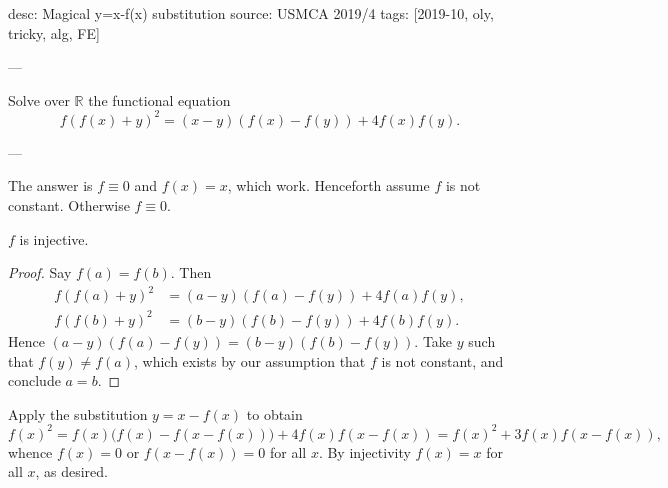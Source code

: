 desc: Magical y=x-f(x) substitution
source: USMCA 2019/4
tags: [2019-10, oly, tricky, alg, FE]

---

Solve over $\mathbb R$ the functional equation \[f(f(x)+y)^2=(x-y)(f(x)-f(y))+4f(x)f(y).\]

---

The answer is $f\equiv0$ and $f(x)=x$, which work. Henceforth assume $f$ is not constant. Otherwise $f\equiv0$.
\begin{iclaim*}
    $f$ is injective.
\end{iclaim*}
\begin{proof}
    Say $f(a)=f(b)$. Then 
    \begin{align*}
        f(f(a)+y)^2&=(a-y)(f(a)-f(y))+4f(a)f(y),\\
        f(f(b)+y)^2&=(b-y)(f(b)-f(y))+4f(b)f(y).
    \end{align*}
    Hence $(a-y)(f(a)-f(y))=(b-y)(f(b)-f(y))$. Take $y$ such that $f(y)\ne f(a)$, which exists by our assumption that $f$ is not constant, and conclude $a=b$.
\end{proof}

Apply the substitution $y=x-f(x)$ to obtain \[f(x)^2=f(x)\big(f(x)-f(x-f(x))\big)+4f(x)f(x-f(x))=f(x)^2+3f(x)f(x-f(x)),\]
whence $f(x)=0$ or $f(x-f(x))=0$ for all $x$. By injectivity $f(x)=x$ for all $x$, as desired.

